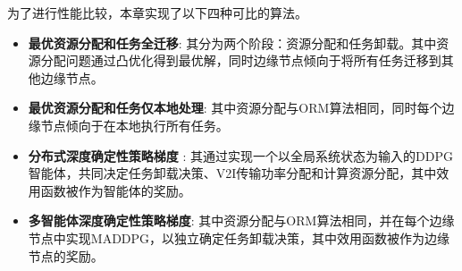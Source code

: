 \begin{table}[h]\small
\centering
{}
\label{table 3-2}
\end{table}
 
为了进行性能比较，本章实现了以下四种可比的算法。
\begin{itemize}
	\item \textbf{最优资源分配和任务全迁移}: 其分为两个阶段：资源分配和任务卸载。其中资源分配问题通过凸优化得到最优解，同时边缘节点倾向于将所有任务迁移到其他边缘节点。
	\item \textbf{最优资源分配和任务仅本地处理}: 其中资源分配与ORM算法相同，同时每个边缘节点倾向于在本地执行所有任务。
	\item \textbf{分布式深度确定性策略梯度} \cite{barth2018distributed}: 其通过实现一个以全局系统状态为输入的DDPG智能体，共同决定任务卸载决策、V2I传输功率分配和计算资源分配，其中效用函数被作为智能体的奖励。
	\item \textbf{多智能体深度确定性策略梯度}\cite{zhang2021adaptive}: 其中资源分配与ORM算法相同，并在每个边缘节点中实现MADDPG，以独立确定任务卸载决策，其中效用函数被作为边缘节点的奖励。
\end{itemize}

